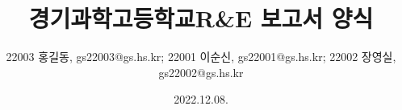 \title{경기과학고등학교\linebreak R\&E 보고서 양식}
\author{22003 홍길동, gs22003@gs.hs.kr; 22001 이순신, gs22001@gs.hs.kr; 22002 장영실, gs22002@gs.hs.kr}
\date{2022.12.08.}
